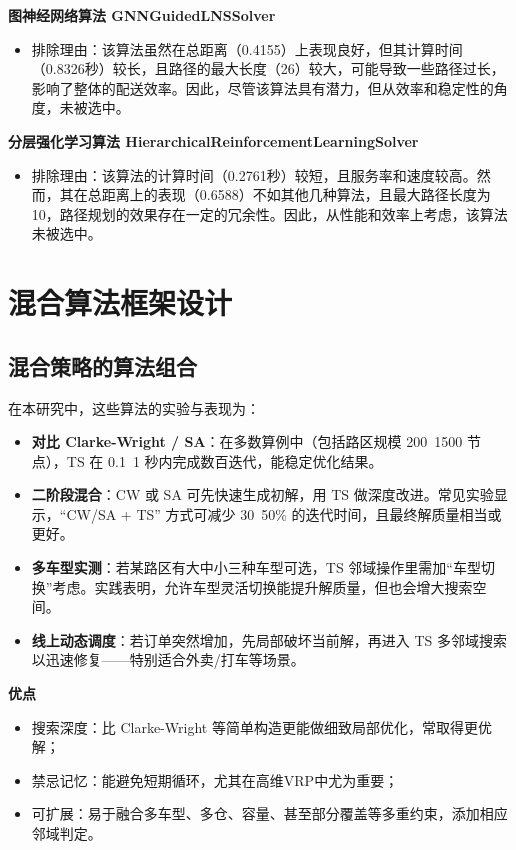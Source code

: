 \documentclass[12pt,a4paper,twoside]{ctexbook}
\begin{document}
\textbf{图神经网络算法 GNNGuidedLNSSolver}

\begin{itemize}
    \item 排除理由：该算法虽然在总距离（0.4155）上表现良好，但其计算时间（0.8326秒）较长，且路径的最大长度（26）较大，可能导致一些路径过长，影响了整体的配送效率。因此，尽管该算法具有潜力，但从效率和稳定性的角度，未被选中。
\end{itemize}

\textbf{分层强化学习算法 HierarchicalReinforcementLearningSolver}

\begin{itemize}
    \item 排除理由：该算法的计算时间（0.2761秒）较短，且服务率和速度较高。然而，其在总距离上的表现（0.6588）不如其他几种算法，且最大路径长度为10，路径规划的效果存在一定的冗余性。因此，从性能和效率上考虑，该算法未被选中。
\end{itemize}


\section{混合算法框架设计}
\subsection{混合策略的算法组合}
在本研究中，这些算法的实验与表现为：
\begin{itemize}
    \item \textbf{对比 Clarke-Wright / SA}：在多数算例中（包括路区规模 200~1500 节点），TS 在 0.1~1 秒内完成数百迭代，能稳定优化结果。
    \item \textbf{二阶段混合}：CW 或 SA 可先快速生成初解，用 TS 做深度改进。常见实验显示，“CW/SA + TS” 方式可减少 30~50\% 的迭代时间，且最终解质量相当或更好。
    \item \textbf{多车型实测}：若某路区有大中小三种车型可选，TS 邻域操作里需加“车型切换”考虑。实践表明，允许车型灵活切换能提升解质量，但也会增大搜索空间。
    \item \textbf{线上动态调度}：若订单突然增加，先局部破坏当前解，再进入 TS 多邻域搜索以迅速修复——特别适合外卖/打车等场景。
\end{itemize}

\textbf{优点}
\begin{itemize}
    \item 搜索深度：比 Clarke-Wright 等简单构造更能做细致局部优化，常取得更优解；
    \item 禁忌记忆：能避免短期循环，尤其在高维VRP中尤为重要；
    \item 可扩展：易于融合多车型、多仓、容量、甚至部分覆盖等多重约束，添加相应邻域判定。
\end{itemize}
\end{document}
